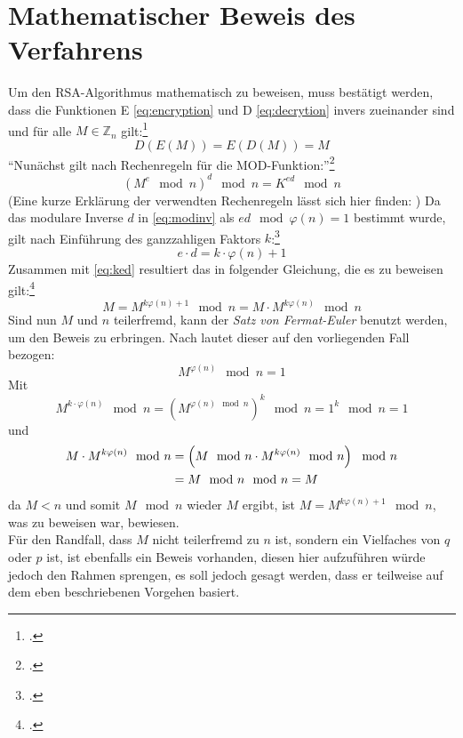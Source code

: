 \documentclass{scrarticle}
\begin{document}
    \section{Mathematischer Beweis des Verfahrens}
        Um den RSA-Algorithmus mathematisch zu beweisen, muss bestätigt werden, dass die Funktionen E \ref{eq:encryption} und D \ref{eq:decrytion} invers zueinander sind und für alle $M\in\mathbb{Z}_n$ gilt:\footcite[vgl.][78]{ertel2003}
        \begin{equation}
            D(E(M)) = E(D(M)) = M
        \end{equation}
        \enquote{Nunächst gilt nach Rechenregeln für die MOD-Funktion:}\footcite[282]{dankmeier2006}
        \begin{equation}
            \left(M^{e}\mod{n}\right)^{d}\mod{n} = K^{ed}\mod{n} \label{eq:ked}
        \end{equation}
        (Eine kurze Erklärung der verwendten Rechenregeln lässt sich hier finden: \cite{modpot})
        Da das modulare Inverse $d$ in \ref{eq:modinv} als $ed\mod{\varphi(n)}=1$ bestimmt wurde, gilt nach Einführung des ganzzahligen Faktors $k$:\footcite[vgl.][72]{watjen2008}
        \begin{equation}
            e\cdot d = k\cdot \varphi(n)+1
        \end{equation}
        Zusammen mit \ref{eq:ked} resultiert das in folgender Gleichung, die es zu beweisen gilt:\footcite[vgl.][282]{dankmeier2006}
        \begin{equation}
           M = M^{k\varphi(n)+1}\mod{n} = M\cdot M^{k\varphi(n)}\mod{n}
        \end{equation}
        Sind nun $M$ und $n$ teilerfremd, kann der \emph{Satz von Fermat-Euler} benutzt werden, um den Beweis zu erbringen. Nach \cite[390]{bronstejn2016} lautet dieser auf den vorliegenden Fall bezogen:
        \begin{equation}
            M^{\varphi(n)} \mod{n} = 1
        \end{equation}
        Mit
        \begin{equation}
            M^{k \cdot \varphi(n)} \mod{n} = \left(M^{\varphi(n)\mod{n}}\right)^{k} \mod{n} = 1^{k}\mod{n} = 1
        \end{equation}
        und
        \begin{align}
            M\cdot M^{k\varphi(n)}\mod{n} &= \left(M\mod{n}\cdot M^{k\varphi(n)}\mod{n}\right)\mod{n}\\
             &= M\mod{n}\mod{n} = M \notag
        \end{align}
        da $M < n$ und somit $M\mod{n}$ wieder $M$ ergibt,
        ist $M = M^{k\varphi(n)+1}\mod{n}$, was zu beweisen war, bewiesen.\\
        Für den Randfall, dass $M$ nicht teilerfremd zu $n$ ist, sondern ein Vielfaches von $q$ oder $p$ ist, ist ebenfalls ein Beweis vorhanden, diesen hier aufzuführen würde jedoch den Rahmen sprengen, es soll jedoch gesagt werden, dass er teilweise auf dem eben beschriebenen Vorgehen basiert.
        
\end{document}
